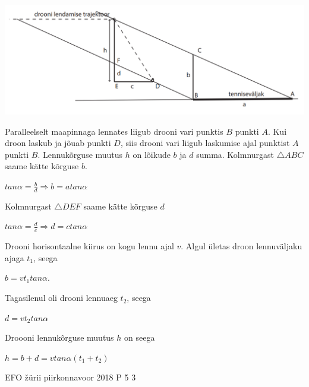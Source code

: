 \documentclass[11pt]{article}
\begin{document}
{{\ifSolution
\begin{center}
	\includegraphics[width=0.5\linewidth]{2017-v3p-10-lah.PNG}
\end{center}
Paralleelselt maapinnaga lennates liigub drooni vari punktis $B$ punkti $A$. Kui droon laskub ja jõuab punkti $D$, siis drooni vari liigub laskumise ajal punktist $A$ punkti $B$.
Lennukõrguse muutus $h$ on lõikude $b$ ja $d$ summa. Kolmnurgast $\triangle ABC$  saame kätte kõrguse $b$.
\begin{center}
$tan\alpha = \frac{b}{d} \Rightarrow b = atan\alpha$
\end{center}
Kolmnurgast $\triangle DEF$ saame kätte kõrguse $d$
\begin{center}
$tan\alpha = \frac{d}{c} \Rightarrow d=ctan\alpha$
\end{center}
Drooni horisontaalne kiirus on kogu lennu ajal $v$. Algul ületas droon lennuväljaku ajaga $t_1$, seega 
\begin{center}
$b = vt_1 tan\alpha$. 
\end{center}
Tagasilenul oli drooni lennuaeg $t_2$, seega 
\begin{center}
$d = vt_2tan\alpha$
\end{center}
Droooni lennukõrguse muutus $h$ on seega 
\begin{center}
$h = b + d = vtan\alpha (t_1 + t_2) $
\end{center}
\fi
}

{EFO žürii} %
{piirkonnavoor} %
{2018} %
{P 5} %
{3} %
{

}}
\end{document}
